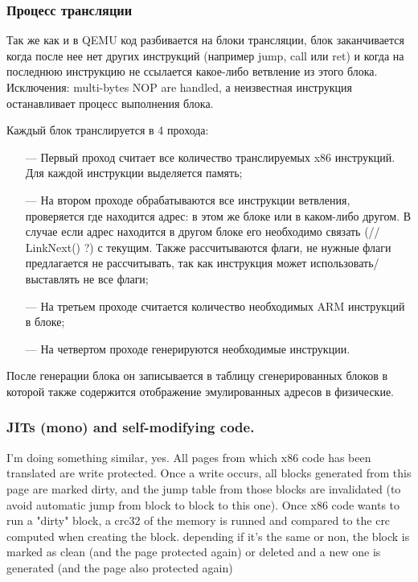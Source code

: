 \subsubsection{Процесс трансляции}

Так же как и в QEMU код разбивается на блоки трансляции, блок заканчивается когда после нее нет других инструкций (например jump, call или ret) и когда на последнюю инструкцию не ссылается какое-либо ветвление из этого блока. Исключения: multi-bytes NOP are handled, а неизвестная инструкция останавливает процесс выполнения блока.

Каждый блок транслируется в 4 прохода:
\begin{itemize}[leftmargin=1.6\parindent]
	\item[---] Первый проход считает все количество транслируемых x86 инструкций. Для каждой инструкции выделяется память;
	\item[---] На втором проходе обрабатываются все инструкции ветвления, проверяется где находится адрес: в этом же блоке или в каком-либо другом. В случае если адрес находится в другом блоке его необходимо связать (// LinkNext() ?) с текущим. Также рассчитываются флаги, не нужные флаги предлагается не рассчитывать, так как инструкция может использовать/выставлять не все флаги;
	\item[---] На третьем проходе считается количество необходимых ARM инструкций в блоке;
	\item[---] На четвертом проходе генерируются необходимые инструкции.
\end{itemize}

После генерации блока он записывается в таблицу сгенерированных блоков в которой также содержится отображение эмулированных адресов в физические.

\subsubsection{JITs (mono) and self-modifying code.}

I'm doing something similar, yes. All pages from which x86 code has been translated are write protected. Once a write occurs, all blocks generated from this page are marked dirty, and the jump table from those blocks are invalidated (to avoid automatic jump from block to block to this one). Once x86 code wants to run a "dirty" block, a crc32 of the memory is runned and compared to the crc computed when creating the block. depending if it's the same or non, the block is marked as clean (and the page protected again) or deleted and a new one is generated (and the page also protected again)


